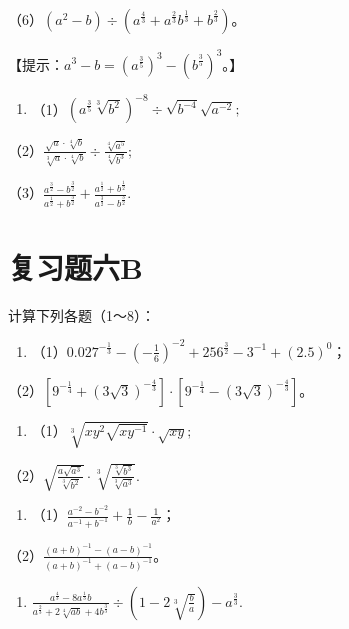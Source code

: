 （6）\((a^2 - b) \div (a^{\frac{4}{3}} + a^{\frac{2}{3}}b^{\frac{1}{3}} + b^{\frac{2}{3}})\)。

【提示：\(a^3 - b = (a^{\frac{3}{5}})^3 - (b^{\frac{3}{5}})^3\)。】

\begin{enumerate}[start=7]
\item
  （1）\((a^{\frac{3}{5}}\sqrt[3]{b^2})^{-8} \div \sqrt{b^{-4}}\sqrt{a^{-2}};\)
\end{enumerate}

（2）\(\frac{\sqrt{a} \cdot \sqrt[4]{b}}{\sqrt[3]{a} \cdot \sqrt[4]{b}} \div \frac{\sqrt[4]{a^5}}{\sqrt[4]{b^3}};\)

（3）\(\frac{a^{\frac{3}{2}} - b^{\frac{3}{2}}}{a^{\frac{1}{2}} + b^{\frac{3}{2}}} + \frac{a^{\frac{1}{2}} + b^{\frac{1}{2}}}{a^{\frac{3}{2}} - b^{\frac{3}{2}}}.\)

\section{复习题六B}

计算下列各题（1～8）：

\begin{enumerate}
\item
  （1）\(0.027^{-\frac{1}{3}} - \left(-\frac{1}{6}\right)^{-2} + 256^{\frac{3}{2}} - 3^{-1} + (2.5)^{0}\)；
\end{enumerate}

（2）\([9^{-\frac{1}{4}} + (3\sqrt{3})^{-\frac{4}{3}}] \cdot [9^{-\frac{1}{4}} - (3\sqrt{3})^{-\frac{4}{3}}]\)。

\begin{enumerate}[start=2]
\item
  （1）\(\sqrt[3]{xy^2\sqrt{xy^{-1}}}\cdot \sqrt{xy};\)
\end{enumerate}

（2）\(\sqrt{\frac{a\sqrt{a^3}}{\sqrt[3]{b^2}}}\cdot \sqrt[3]{\frac{\sqrt[3]{b^3}}{\sqrt[3]{a^3}}}.\)

\begin{enumerate}[start=3]
\item
  （1）\(\frac{a^{-2} - b^{-2}}{a^{-1} + b^{-1}} + \frac{1}{b} - \frac{1}{a^2}\)；
\end{enumerate}

（2）\(\frac{(a + b)^{-1} - (a - b)^{-1}}{(a + b)^{-1} + (a - b)^{-1}}\)。

\begin{enumerate}[start=4]
\item
  \(\frac{a^{\frac{4}{3}} - 8a^{\frac{1}{3}}b}{a^{\frac{2}{3}} + 2\sqrt[4]{ab} + 4b^{\frac{3}{3}}} \div \left(1 - 2\sqrt[3]{\frac{b}{a}}\right) - a^{\frac{3}{3}}.\)
\end{enumerate}

